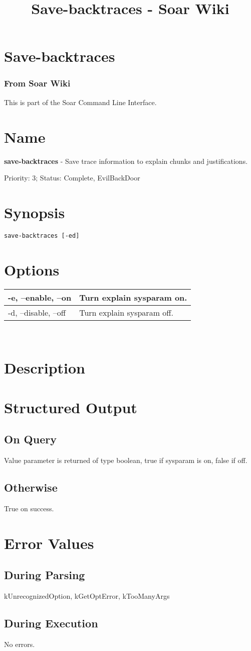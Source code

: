 \documentclass[10pt]{article}
\title{Save-backtraces - Soar Wiki}
\begin{document}
\section*{Save-backtraces}
\subsubsection*{From Soar Wiki}


 This is part of the Soar Command Line Interface. 
\section*{ Name }


 \textbf{save-backtraces}
 - Save trace information to explain chunks and justifications. 


 Priority: 3; Status: Complete, EvilBackDoor
\section*{ Synopsis }
\begin{verbatim}
save-backtraces [-ed]

\end{verbatim}
\section*{ Options }


\begin{tabular}{|p{1in}|p{5in}|}
\hline 
 -e, --enable, --on  & Turn explain sysparam on.  \\
 \hline 
 -d, --disable, --off  & Turn explain sysparam off.  \\
 \hline 

\end{tabular}



 \\ 

\section*{ Description }
\section*{ Structured Output }
\subsection*{ On Query }


 Value parameter is returned of type boolean, true if sysparam is on, false if off. 
\subsection*{ Otherwise }


 True on success. 
\section*{ Error Values }
\subsection*{ During Parsing }


 kUnrecognizedOption, kGetOptError, kTooManyArgs
\subsection*{ During Execution }


 No errors. 
\end{document}
